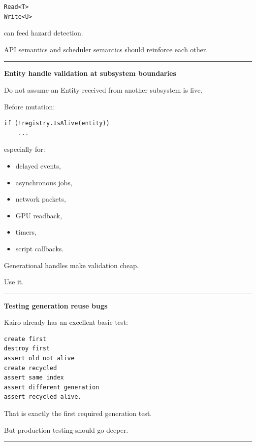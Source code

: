 \begin{verbatim}
Read<T>
Write<U>
\end{verbatim}

can feed hazard detection.

API semantics and scheduler semantics should reinforce each other.

\begin{center}\rule{0.5\linewidth}{0.5pt}\end{center}

\textbf{Entity handle validation at subsystem boundaries}

Do not assume an Entity received from another subsystem is live.

Before mutation:

\begin{verbatim}
if (!registry.IsAlive(entity))
    ...
\end{verbatim}

especially for:

\begin{itemize}
\tightlist
\item
  delayed events,
\item
  asynchronous jobs,
\item
  network packets,
\item
  GPU readback,
\item
  timers,
\item
  script callbacks.
\end{itemize}

Generational handles make validation cheap.

Use it.

\begin{center}\rule{0.5\linewidth}{0.5pt}\end{center}

\textbf{Testing generation reuse bugs}

Kairo already has an excellent basic test:

\begin{verbatim}
create first
destroy first
assert old not alive
create recycled
assert same index
assert different generation
assert recycled alive.
\end{verbatim}

That is exactly the first required generation test.

But production testing should go deeper.

\begin{center}\rule{0.5\linewidth}{0.5pt}\end{center}

